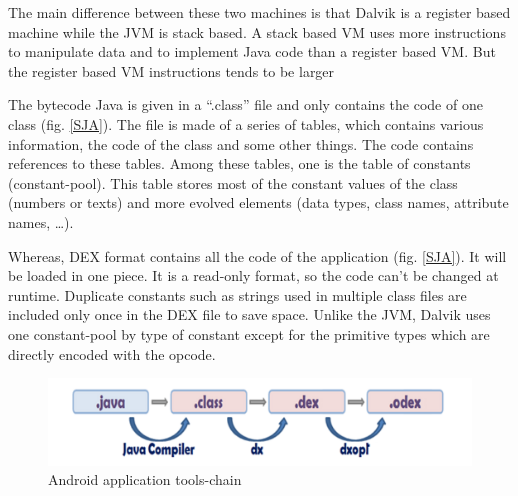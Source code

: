 \documentclass{sigplanconf}
\def \DALVIK{\mbox{Dalvik}\xspace}
\def \ANDROID{\mbox{Android}\xspace}
\def \JVM{JVM\xspace}
\def \DEX{\mbox{DEX}\xspace}
\begin{document}
      The main difference between these two machines is that \DALVIK is a register based machine while the \JVM is stack based.
      A stack based VM uses more instructions to manipulate data and to implement Java code than a register based VM.
      But the register based VM instructions tends to be larger \cite{ieee-paul-kundu-energy-perspective}

      The bytecode Java is given in a ``.class'' file and only contains the code of one class (fig. \ref{SJA}).
      The file is made of a series of tables, which contains various information, the code of the class and some other things.
      The code contains references to these tables.
      Among these tables, one is the table of constants (constant-pool).
      This table stores most of the constant values of the class (numbers or texts)
      and more evolved elements (data types, class names, attribute names, \dots).

      Whereas, \DEX format contains all the code of the application (fig. \ref{SJA}).
      It will be loaded in one piece.
      It is a read-only format, so the code can't be changed at runtime.
      Duplicate constants such as strings used in multiple class files
      are included only once in the \DEX file to save space.
      Unlike the \JVM, \DALVIK uses one constant-pool by type of constant
      except for the primitive types which are directly encoded with the opcode.\\

      \begin{figure}[h]
        \centering
        \includegraphics[width=\columnwidth]{dex-tools-chain.png}
        \caption{\ANDROID application tools-chain}
        \label{DTC}
      \end{figure}
\end{document}
